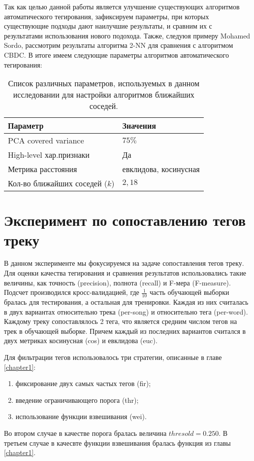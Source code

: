 Так как целью данной работы является улучшение существующих алгоритмов автоматического тегирования, зафиксируем параметры, при которых существующие подходы дают наилучшие результаты, 
и сравним их с результатами использования нового подохода. Также, следуюя примеру Mohamed Sordo, рассмотрим результаты алгоритма 2-NN для сравнения с алгоритмом CBDC.
В итоге имеем следующие параметры алгоритмов автоматического тегирования:
\begin{table}[ht]
\centering
\captionsetup{justification=centering}
\caption{Список различных параметров, используемых в данном исследовании для настройки алгоритмов ближайших соседей.}
\label{tab:new_algo_settings}
\begin{tabular}{ p{5cm}  p{4cm} }
  \hline    
  Параметр & Значения \\
  \hline    
  PCA covered variance & $75\%$ \\
  High-level хар.признаки & Да \\
  Метрика расстояния & евклидова, косинусная \\
  Кол-во ближайших соседей ($k$) & $2, 18$ \\
  \hline    
\end{tabular}
\end{table}

\section{Эксперимент по сопоставлению тегов треку}

В данном эксперименте мы фокусируемся на задаче сопоставления тегов треку. Для оценки качества тегирования и сравнения результатов использовались такие величины, как
точность (precision), полнота (recall) и F-мера (F-measure). Подсчет производился кросс-валидацией, где $\frac{1}{10}$ часть обучающей выборки бралась для тестирования, а остальная \ld для тренировки.
Каждая из них считалась в двух вариантах \ld относительно трека (per-song) и относительно тега (per-word).
Каждому треку сопоставлялось 2 тега, что является средним числом тегов на трек в обучающей выборке. Причем каждый из последних вариантов считался в двух метриках \ld косинусная (cos) и евклидова (euc).

Для фильтрации тегов использовалось три стратегии, описанные в главе \ref{chapter1}:
\begin{enumerate}
 \item фиксирование двух самых частых тегов (fir);
 \item введение ограничивающего порога (thr);
 \item использование функции взвешивания (wei).
\end{enumerate}
Во втором случае в качестве порога бралась величина $thresold = 0.250$. В третьем случае в качесвте функции взвешивания бралась функция из главы \ref{chapter1}.

